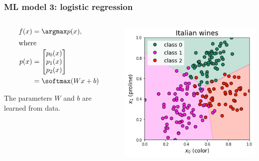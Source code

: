 \begin{frame}
    \frametitle{ML model 3: logistic regression}

    \begin{columns}
        \begin{column}{0.5\linewidth}
        \begin{align*}
            f(x) &= \argmax p(x),\\
            \intertext{where}
            p(x) &= \begin{bmatrix}
                p_0(x)\\ p_1(x)\\p_2(x)
            \end{bmatrix}\\
            &= \softmax(Wx + b)
        \end{align*}

        The parameters $W$ and $b$ are learned from data.
        \end{column}
        \begin{column}{0.5\linewidth}
            \includegraphics[scale=0.45]{wines-lr.jpg}
        \end{column}
    \end{columns}
\end{frame}
